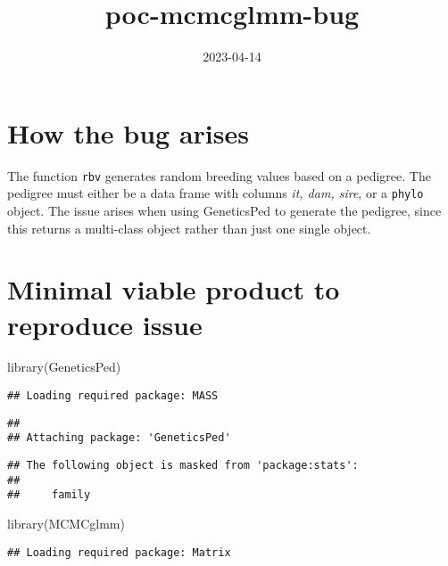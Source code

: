 \documentclass[
]{article}
\title{poc-mcmcglmm-bug}
\author{}
\date{\vspace{-2.5em}2023-04-14}
\newenvironment{Shaded}{\begin{snugshade}}{\end{snugshade}}
\newcommand{\FunctionTok}[1]{\textcolor[rgb]{0.00,0.00,0.00}{#1}}
\newcommand{\NormalTok}[1]{#1}
\begin{document}
\maketitle

\hypertarget{how-the-bug-arises}{%
\section{How the bug arises}\label{how-the-bug-arises}}

The function \texttt{rbv} generates random breeding values based on a
pedigree. The pedigree must either be a data frame with columns
\emph{it, dam, sire}, or a \texttt{phylo} object. The issue arises when
using GeneticsPed to generate the pedigree, since this returns a
multi-class object rather than just one single object.

\hypertarget{minimal-viable-product-to-reproduce-issue}{%
\section{Minimal viable product to reproduce
issue}\label{minimal-viable-product-to-reproduce-issue}}

\begin{Shaded}
\begin{Highlighting}[]
\FunctionTok{library}\NormalTok{(GeneticsPed)}
\end{Highlighting}
\end{Shaded}

\begin{verbatim}
## Loading required package: MASS
\end{verbatim}

\begin{verbatim}
## 
## Attaching package: 'GeneticsPed'
\end{verbatim}

\begin{verbatim}
## The following object is masked from 'package:stats':
## 
##     family
\end{verbatim}

\begin{Shaded}
\begin{Highlighting}[]
\FunctionTok{library}\NormalTok{(MCMCglmm)}
\end{Highlighting}
\end{Shaded}

\begin{verbatim}
## Loading required package: Matrix
\end{verbatim}
\end{document}
